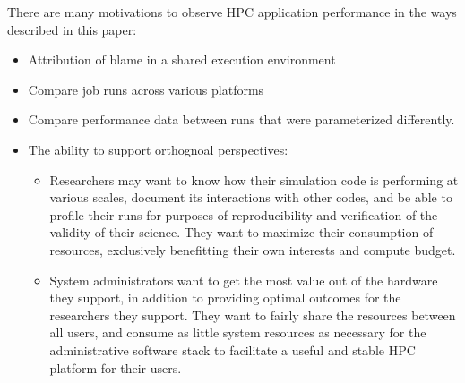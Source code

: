 There are many motivations to observe HPC application performance in
the ways described in this paper:
\begin{itemize}
\item Attribution of blame in a shared execution environment
\item Compare job runs across various platforms
\item Compare performance data between runs that were parameterized differently.
\item The ability to support orthognoal perspectives:
  \begin{itemize}
     \item Researchers may want to know how their simulation code is
       performing at various scales, document its interactions with other
       codes, and be able to profile their runs for purposes of
       reproducibility and verification of the validity of their science.
       They want to maximize their consumption of resources, exclusively
       benefitting their own interests and compute budget.
     \item System administrators want to get the most value out of the
       hardware they support, in addition to providing optimal
       outcomes for the researchers they support. They want to fairly
       share the resources between all users, and consume as little
       system resources as necessary for the administrative software
       stack to facilitate a useful and stable HPC platform for their users.
  \end{itemize}
\end{itemize}





